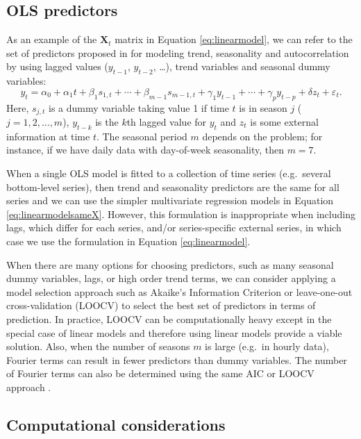 \documentclass[11pt,a4paper,]{article}
\begin{document}
\hypertarget{ols-predictors}{%
\subsection{OLS predictors}\label{ols-predictors}}

As an example of the \(\bm{X}_t\) matrix in Equation \eqref{eq:linearmodel}, we can refer to the set of predictors proposed in \textcite{ashouri2018} for modeling trend, seasonality and autocorrelation by using lagged values (\(y_{t-1}\), \(y_{t-2}\), \dots), trend variables and seasonal dummy variables:
\begin{equation}\label{eq:linearmodelexample}
   y_t = \alpha_0 + \alpha_1 t + \beta_1 s_{1,t} + \cdots + \beta_{m-1} s_{m-1,t} + \gamma_1 y_{t-1} + \cdots + \gamma_p y_{t-p} + \delta z_t + \varepsilon_t.
\end{equation}
Here, \(s_{j,t}\) is a dummy variable taking value 1 if time \(t\) is in season \(j\) (\(j=1, 2, \dots, m\)), \(y_{t-k}\) is the \(k\)th lagged value for \(y_t\) and \(z_t\) is some external information at time \(t\). The seasonal period \(m\) depends on the problem; for instance, if we have daily data with day-of-week seasonality, then \(m=7\).

When a single OLS model is fitted to a collection of time series (e.g.~several bottom-level series), then trend and seasonality predictors are the same for all series and we can use the simpler multivariate regression models in Equation \eqref{eq:linearmodelsameX}. However, this formulation is inappropriate when including lags, which differ for each series, and/or series-specific external series, in which case we use the formulation in Equation \eqref{eq:linearmodel}.

When there are many options for choosing predictors, such as many seasonal dummy variables, lags, or high order trend terms, we can consider applying a model selection approach such as Akaike's Information Criterion or leave-one-out cross-validation (LOOCV) to select the best set of predictors in terms of prediction. In practice, LOOCV can be computationally heavy except in the special case of linear models \autocite{christensenplane} and therefore using linear models provide a viable solution. Also, when the number of seasons \(m\) is large (e.g.~in hourly data), Fourier terms can result in fewer predictors than dummy variables. The number of Fourier terms can also be determined using the same AIC or LOOCV approach \autocite{fpp2}.

\hypertarget{computational-considerations}{%
\subsection{\texorpdfstring{Computational considerations \label{sec:computationalconsiderations}}{Computational considerations }}\label{computational-considerations}}
\end{document}
